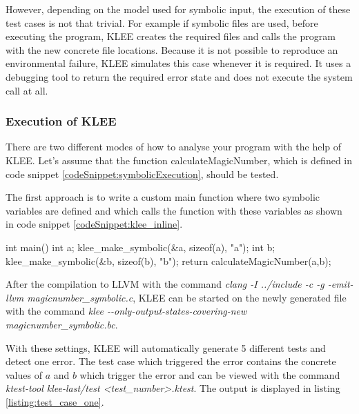 However, depending on the model used for symbolic input, the execution of these test cases is not that trivial. For example if symbolic files are used, before executing the program, KLEE creates the required files and calls the program with the new concrete file locations. 
Because it is not possible to reproduce an environmental failure, KLEE simulates this case whenever it is required. It uses a debugging tool to return the required error state and does not execute the system call at all.

\subsubsection{Execution of KLEE}
There are two different modes of how to analyse your program with the help of KLEE. Let's assume that the function calculateMagicNumber, which is defined in code snippet \ref{codeSnippet:symbolicExecution}, should be tested.

The first approach is to write a custom main function where two symbolic variables are defined and which calls the function with these variables as shown in code snippet \ref{codeSnippet:klee_inline}.
\begin{codesnippet}[caption={Main function which defines two symbolic variables and calls the function calculateMagicNumber of code snippet \ref{codeSnippet:symbolicExecution}.}, label={codeSnippet:klee_inline}]
int main() {
  int a;
  klee_make_symbolic(&a, sizeof(a), "a");
  int b;
  klee_make_symbolic(&b, sizeof(b), "b");
  return calculateMagicNumber(a,b);
}
\end{codesnippet}

After the compilation to LLVM with the command \textit{clang -I ../include -c -g -emit-llvm magicnumber\_symbolic.c}, KLEE can be started on the newly generated file with the command \textit{klee -{}-only-output-states-covering-new magicnumber\_symbolic.bc}.

With these settings, KLEE will automatically generate 5 different tests and detect one error. 
The test case which triggered the error contains the concrete values of $a$ and $b$ which trigger the error and can be viewed with the command \textit{ktest-tool klee-last/test \textless test\_number\textgreater.ktest}.
The output is displayed in listing \ref{listing:test_case_one}.

